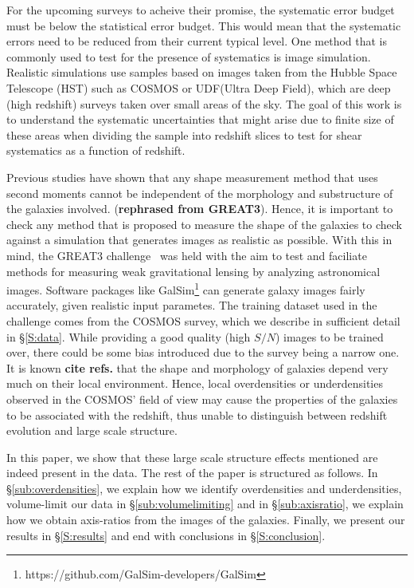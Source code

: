 \documentclass[twocolumn,useAMS,usenatbib]{mn2e}
\begin{document}
For the upcoming surveys to acheive their promise, the systematic error budget must be below the statistical error budget. This would mean that the systematic errors need to be reduced from their current typical level.
One method that is commonly used to test for the presence of systematics is image simulation. Realistic simulations use samples based on images taken from the Hubble Space Telescope (HST) such as COSMOS or UDF(Ultra Deep Field), which are deep (high redshift) surveys taken over small areas of the sky.
The goal of this work is to understand the systematic uncertainties that might arise due to finite size of these areas when dividing the sample into redshift slices to test for 
shear systematics as a function of redshift.

Previous studies have shown that any shape measurement method that uses second moments cannot be independent of the morphology and substructure of the galaxies involved. ({\bf rephrased from GREAT3}).
Hence, it is important to check any method that is proposed to measure the shape of the galaxies to check against a simulation that generates images as realistic as possible.  
With this in mind, the GREAT3 challenge~\citep{great3} was held with the aim to test and faciliate methods for measuring weak gravitational lensing by analyzing astronomical images.
Software packages like GalSim\footnote{https://github.com/GalSim-developers/GalSim} can generate galaxy images fairly accurately, given realistic input parametes.
The training dataset used in the challenge comes from the COSMOS survey, which we describe in sufficient detail in \S\ref{S:data}.
While providing a good quality (high $S/N$) images to be trained over, there could be some bias introduced due to the survey being a narrow one.
It is known {\bf cite refs.} that the shape and morphology of galaxies depend very much on their local environment. Hence, local overdensities or underdensities
observed in the COSMOS' field of view may cause the properties of the galaxies to be associated with the redshift, thus unable to distinguish between redshift evolution and large scale structure.

In this paper, we show that these large scale structure effects mentioned are indeed present in the data. The rest of the paper is structured as follows.
In \S\ref{sub:overdensities}, we explain how we identify overdensities and underdensities, volume-limit our data in \S\ref{sub:volumelimiting} and in \S\ref{sub:axisratio},
 we explain how we obtain axis-ratios from the images of the galaxies. Finally, we present our results in \S\ref{S:results} and end with conclusions in \S\ref{S:conclusion}.
\end{document}
